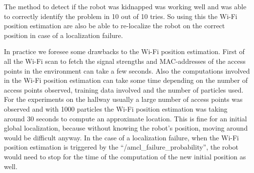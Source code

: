 The method to detect if the robot was kidnapped was working well and was able to correctly identify the problem in 10 out of 10 tries. So using this the Wi-Fi position estimation are also be able to re-localize the robot on the correct position in case of a localization failure.

In practice we foresee some drawbacks to the Wi-Fi position estimation. First of all the Wi-Fi scan to fetch the signal strengths and MAC-addresses of the access points in the environment can take a few seconds. Also the computations involved in the Wi-Fi position estimation can take some time depending on the number of access points observed, training data involved and the number of particles used. For the experiments on the hallway usually a large number of access points was observed and with 1000 particles the Wi-Fi position estimation was taking around 30 seconds to compute an approximate location. This is fine for an initial global localization, because without knowing the robot's position, moving around would be difficult anyway. In the case of a localization failure, when the Wi-Fi position estimation is triggered by the ``/amcl\_failure\_probability'', the robot would need to stop for the time of the computation of the new initial position as well. 